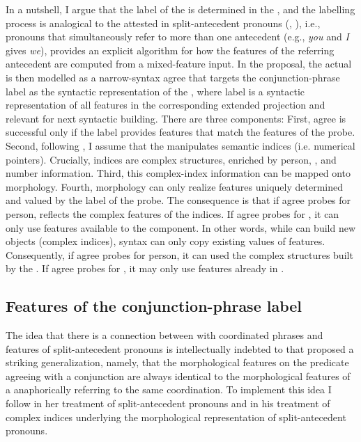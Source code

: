 \documentclass[output=paper,modfontsnewtxmath,hidelinks]{langscibook}
\begin{document}
In a nutshell, I argue that the label of the  is determined in the , and the labelling process is analogical to the  attested in split-antecedent pronouns (\citealt{Heim2008}, \citealt{Sudo2012}), i.e.,  pronouns that simultaneously refer to more than one antecedent (e.g., \textit{you} and \textit{I} gives \textit{we}), provides an explicit algorithm for how the features of the referring antecedent are computed from a mixed-feature input. In the  proposal, the actual  is then modelled as a narrow-syntax agree that targets the conjunction-phrase label as the syntactic representation of the , where label is a syntactic representation of all features  in the corresponding extended projection and relevant for next syntactic building. There are three components: First, agree is successful only if the label provides features that match the features of the probe. Second, following \citet{Sudo2012}, I assume that the  manipulates semantic indices (i.e. numerical pointers). Crucially, indices are complex structures, enriched by person, , and number information. Third,  this complex-index information can be mapped onto morphology. Fourth, morphology can only realize features uniquely determined and valued by the label of the probe. The consequence is that if agree probes for person,  reflects the complex features of the indices. If agree probes for , it can only use  features available to the  component. In other words, while  can build new objects (complex indices), syntax can only copy existing values of features. Consequently, if agree probes for person, it can used the complex structures built by the . If agree probes for , it may only use features already  in .

\subsection{Features of the conjunction-phrase label}

The idea that there is a connection between  with coordinated  phrases and features of split-antecedent pronouns is intellectually indebted to \citet{Farkas1995} that proposed a striking generalization, namely, that the morphological features on the predicate agreeing with a  conjunction are always identical to the morphological features of a  anaphorically referring to the same coordination. To implement this idea I follow \citet{Heim2008} in her treatment of split-antecedent pronouns and \citet{Sudo2012} in his treatment of complex indices underlying the morphological representation of split-antecedent pronouns. 
\end{document}

